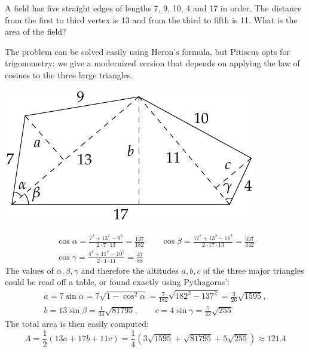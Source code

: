 \begin{minipage}[t]{0.58\linewidth}\vspace{0pt}
\label{ex:pitiscus}

A field has five straight edges of lengths 7, 9, 10, 4 and 17 in order. The distance from the first to third vertex is 13 and from the third to fifth is 11. What is the area of the field?\smallbreak

The problem can be solved easily using Heron's formula, but Pitiscus opts for trigonometry; we give a modernized version that depends on applying the law of cosines to the three large triangles.
\end{minipage}\hfill\begin{minipage}[t]{0.4\linewidth}\vspace{0pt}
\flushright\includegraphics[scale=0.9]{ren-pitiscus}
\end{minipage}\par

\begin{gather*}
\cos\alpha=\frac{7^2+13^2-9^2}{2\cdot 7\cdot 13}%
=\frac{137}{182}\qquad
\cos\beta=\frac{17^2+13^2-11^2}{2\cdot 17\cdot 13}%
=\frac{337}{442}\\
\cos\gamma=\frac{4^2+11^2-10^2}{2\cdot 4\cdot 11}%
=\frac{37}{88}
\end{gather*}
The values of $\alpha,\beta,\gamma$ and therefore the altitudes $a,b,c$ of the three major triangles could be read off a table, or found exactly using Pythagoras':
\begin{gather*}
a=7\sin\alpha=7\sqrt{1-\cos^2\!\alpha}=\frac 7{182}\sqrt{182^2-137^2} =\frac 3{26}\sqrt{1595},\\
b=13\sin\beta=\frac{1}{34}\sqrt{81795},\qquad c=4\sin\gamma =\frac 5{22}\sqrt{255}
\end{gather*}
The total area is then easily computed:
\[A=\frac 12(13a+17b+11c)=\frac 14\left(3\sqrt{1595} + \sqrt{81795} + 5\sqrt{255}\right) \approx 121.4\]

